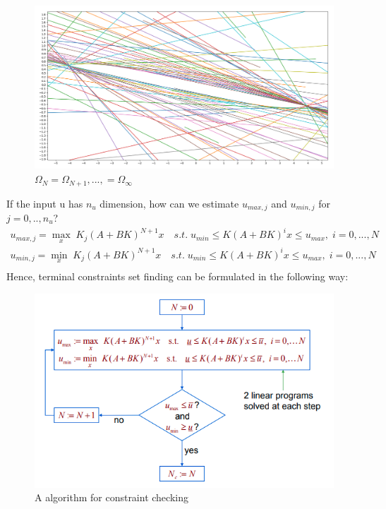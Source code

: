 \documentclass[12pt]{article}%
\begin{document}
\begin{figure}[H]
    \begin{center}
    \includegraphics[width=16cm]{mpi_set.png}
    \caption{$\Omega_N = \Omega_{N+1},...,=\Omega_{\infty}$}\label{f:const}
    \end{center}
\end{figure}

If the input u has $n_u$ dimension, how can we estimate $u_{max, j}$ and $u_{min,j}$ for $j=0,..,n_u$? 
\begin{equation}
    \begin{aligned}
         u_{max,j} = \max_x \; K_j(A+BK)^{N+1}x \quad s.t. \; u_{min} \leq K(A+BK)^ix \leq u_{max}, \; i=0,...,N\\
         u_{min,j} = \min_x \; K_j(A+BK)^{N+1}x \quad s.t. \; u_{min} \leq K(A+BK)^ix \leq u_{max},\; i=0,...,N\\
    \end{aligned}
\end{equation} Hence, terminal constraints set finding can be formulated in the following way:

\begin{figure}[H]\label{terminal_set_check}
    \begin{center}
    \includegraphics[width=12cm]{fin_t.png}
    \caption{A algorithm for constraint checking~\cite{mpc_1}}\label{f:fin_t}
    \end{center}
\end{figure}
\end{document}
